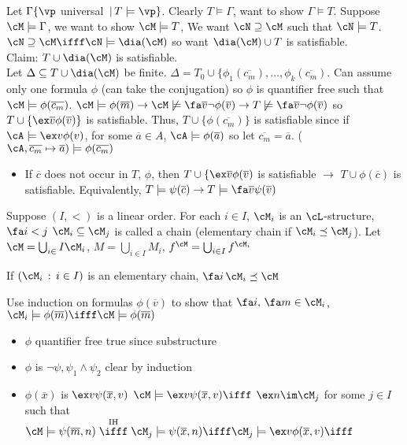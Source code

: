 \begin{pf}
    Let $\Gamma \{ \vp$ universal $\, | \, T \models \vp\}$. Clearly $T \models \Gamma$, want to show $\Gamma \models T$. Suppose $\cM \models \Gamma$, we want to show $\cM \models T$, We want $\cN \supseteq \cM$ such that $\cN \models T$. $\cN \supseteq \cM \ifff \cN \models \dia(\cM)$ so want $\dia(\cM) \cup T$ is satisfiable. \\
    Claim: $T \cup \dia(\cM)$ is satisfiable.  \\
    Let $\Delta \subseteq T \cup \dia(\cM)$ be finite. $\Delta = T_0 \cup \{\phi_1(\overline{c_m}), \ldots, \phi_k(\overline{c_m})$. Can assume only one formula $\phi$ (can take the conjugation) so $\phi$ is quantifier free such that $\cM \models \phi(\overline{c_m})$. $\cM \models \phi(\overline{m}) \to \cM \not\models \fa \overline{v} \neg \phi(\overline{v}) \to T \not\models \fa \overline{v} \neg \phi(\overline{v})$ so $T \cup \{\ex \overline{v} \phi(\overline{v})\}$ is satisfiable. Thus, $T \cup \{ \phi(\overline{c_m})\}$ is satisfiable since if $\cA \models \ex v \phi(v)$, for some $\overline{a} \in A$, $\cA \models \phi(\overline{a})$ so let $\overline{c_m} = \overline{a}$. ($\cA, \overline{c_m} \mapsto \overline{a}) \models \phi(\overline{c_m})$ 
\end{pf}

\begin{itemize}
    \item If $\overline{c}$ does not occur in $T$, $\phi$, then $T \cup \{ \ex \overline{v} \phi(\overline{v})$ is satisfiable $\to$ $T \cup \phi(\overline{c})$ is satisfiable. Equivalently, $T \models \psi(\overline{c}) \to T \models \fa \overline{v} \psi(\overline{v})$
\end{itemize}

\noindent
Suppose $(I, <)$ is a linear order. For each $i \in I$, $\cM_i$ is an $\cL$-structure, $\fa i < j$ $\cM_i \subseteq \cM_j$ is called a chain (elementary chain if $\cM_i \preceq \cM_j$). Let $\cM = \bigcup_{i\in} I\cM_i$, $M = \bigcup_{i \in I}M_i$, $f^{\cM} = \bigcup_{i\in I} f^{\cM_i}$ 

\begin{proposition}
    If $(\cM_i \, : \, i \in I)$ is an elementary chain, $\fa i \, \cM_i \preceq \cM$ 
\end{proposition}

\begin{pf}
    Use induction on formulas $\phi(\overline{v})$ to show that $\fa i, \, \fa m \in \cM_i$, $\cM_i \models \phi(\overline{m}) \ifff \cM \models \phi(\overline{m})$ 
    \begin{itemize}
        \item $\phi$ quantifier free true since substructure 
        \item $\phi$ is $\neg \psi, \psi_1 \wedge \psi_2$ clear by induction 
        \item $\phi(\overline{x})$ is $\ex v \psi(\overline{x}, v)$ $\cM \models \ex v \psi(\overline{x}, v) \ifff$ $\ex n \im \cM_j$ for some $j \in I$ such that $\cM \models \psi(\overline{m}, n) \stackrel{\text{IH}}{\ifff} \cM_j \models \psi(\overline{x}, n) \ifff \cM_j \models \ex v \phi(\overline{x}, v) \ifff$
    \end{itemize}
\end{pf}